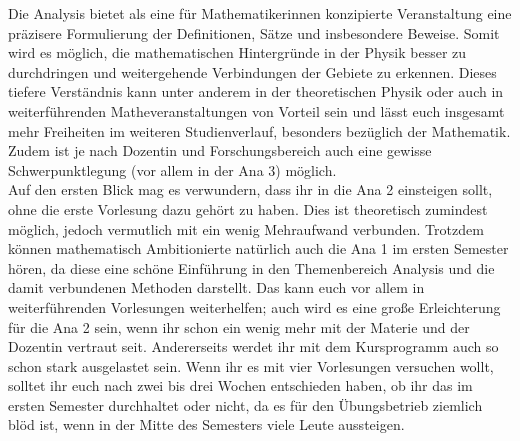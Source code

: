 Die Analysis bietet als eine für Mathematikerinnen konzipierte Veranstaltung eine präzisere Formulierung der Definitionen, Sätze und insbesondere Beweise. Somit wird es möglich, die mathematischen Hintergründe in der Physik besser zu durchdringen und weitergehende Verbindungen der Gebiete zu erkennen. Dieses tiefere Verständnis kann unter anderem in der theoretischen Physik oder auch in weiterführenden Matheveranstaltungen von Vorteil sein und lässt euch insgesamt mehr Freiheiten im weiteren Studienverlauf, besonders bezüglich der Mathematik. Zudem ist je nach Dozentin und Forschungsbereich auch eine gewisse Schwerpunktlegung (vor allem in der \gls{Ana} 3) möglich. \\

Auf den ersten Blick mag es verwundern, dass ihr in die \gls{Ana} 2 einsteigen sollt, ohne die erste Vorlesung dazu gehört zu haben. Dies ist theoretisch zumindest möglich, jedoch vermutlich mit ein wenig Mehraufwand verbunden. Trotzdem können mathematisch Ambitionierte natürlich auch die \gls{Ana} 1 im ersten Semester hören, da diese eine schöne Einführung in den Themenbereich Analysis und die damit verbundenen Methoden darstellt. Das kann euch vor allem in weiterführenden Vorlesungen weiterhelfen; auch wird es eine große Erleichterung für die \gls{Ana} 2 sein, wenn ihr schon ein wenig mehr mit der Materie und der Dozentin vertraut seit. Andererseits werdet ihr mit dem Kursprogramm auch so schon stark ausgelastet sein. Wenn ihr es mit vier Vorlesungen versuchen wollt, solltet ihr euch nach zwei bis drei Wochen entschieden haben, ob ihr das im ersten Semester durchhaltet oder nicht, da es für den Übungsbetrieb ziemlich blöd ist, wenn in der Mitte des Semesters viele Leute aussteigen.


\begin{figure}[b!]
\end{figure}

